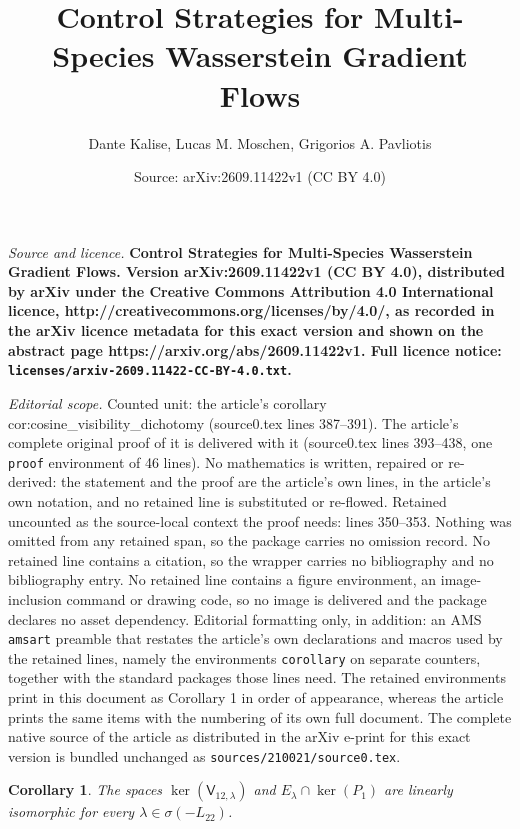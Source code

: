 \documentclass[10pt,a4paper]{amsart}
\title{\LARGE \bf Control Strategies for Multi-Species Wasserstein Gradient Flows}
\author{Dante Kalise, Lucas M. Moschen, Grigorios A. Pavliotis}
\date{Source: arXiv:2609.11422v1 (CC BY 4.0)}
\newtheorem{corollary}{Corollary}
\begin{document}
\maketitle

\noindent\emph{Source and licence.} \LARGE \bf Control Strategies for Multi-Species Wasserstein Gradient Flows. Version arXiv:2609.11422v1 (CC BY 4.0), distributed by arXiv under the Creative Commons Attribution 4.0 International licence, http://creativecommons.org/licenses/by/4.0/, as recorded in the arXiv licence metadata for this exact version and shown on the abstract page https://arxiv.org/abs/2609.11422v1. Full licence notice: \texttt{licenses/arxiv-2609.11422-CC-BY-4.0.txt}.\par\smallskip

\noindent\textit{Editorial scope.} Counted unit: the article's corollary cor:cosine\_visibility\_dichotomy (source0.tex lines 387--391). The article's complete original proof of it is delivered with it (source0.tex lines 393--438, one \texttt{proof} environment of 46 lines). No mathematics is written, repaired or re-derived: the statement and the proof are the article's own lines, in the article's own notation, and no retained line is substituted or re-flowed.  Retained uncounted as the source-local context the proof needs: lines 350--353.  Nothing was omitted from any retained span, so the package carries no omission record.  No retained line contains a citation, so the wrapper carries no bibliography and no bibliography entry.  No retained line contains a figure environment, an image-inclusion command or drawing code, so no image is delivered and the package declares no asset dependency.  Editorial formatting only, in addition: an AMS \texttt{amsart} preamble that restates the article's own declarations and macros used by the retained lines, namely the environments \texttt{corollary} on separate counters, together with the standard packages those lines need.  The retained environments print in this document as Corollary 1 in order of appearance, whereas the article prints the same items with the numbering of its own full document.  The complete native source of the article as distributed in the arXiv e-print for this exact version is bundled unchanged as \texttt{sources/210021/source0.tex}.
\begin{corollary}
    \label{cor:fourier_two_species}
    The spaces $\ker(\mathsf{V}_{12,\lambda})$ and $E_\lambda \cap \ker(P_1)$ are linearly isomorphic for every $\lambda \in \sigma(-L_{22})$.
\end{corollary}
\end{document}
